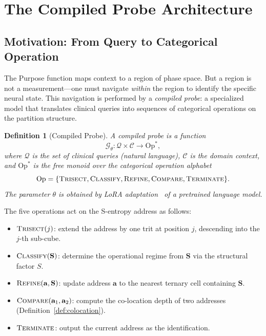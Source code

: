 \documentclass[aps,prd,twocolumn,superscriptaddress,floatfix,nofootinbib]{revtex4-2}
\newtheorem{definition}[theorem]{Definition}
\theoremstyle{remark}
\newcommand{\Svec}{\mathbf{S}}
\newcommand{\Context}{\mathcal{C}}
\newcommand{\Probe}{\mathcal{G}}
\begin{document}
\section{The Compiled Probe Architecture}
\label{sec:probe}

\subsection{Motivation: From Query to Categorical Operation}

The Purpose function maps context to a region of phase space.
But a region is not a measurement---one must navigate \emph{within} the region to identify the specific neural state.
This navigation is performed by a \emph{compiled probe}: a specialized model that translates clinical queries into sequences of categorical operations on the partition structure.

\begin{definition}[Compiled Probe]
\label{def:probe}
A compiled probe is a function
\begin{equation}
\Probe_\theta\colon \mathcal{Q} \times \Context \to \mathrm{Op}^*,
\end{equation}
where $\mathcal{Q}$ is the set of clinical queries (natural language), $\Context$ is the domain context, and $\mathrm{Op}^*$ is the free monoid over the categorical operation alphabet
\begin{equation}
\mathrm{Op} = \{\textsc{Trisect}, \textsc{Classify}, \textsc{Refine}, \textsc{Compare}, \textsc{Terminate}\}.
\end{equation}
The parameter $\theta$ is obtained by LoRA adaptation~\cite{hu2022lora} of a pretrained language model.
\end{definition}

The five operations act on the S-entropy address as follows:
\begin{itemize}[noitemsep]
    \item $\textsc{Trisect}(j)$: extend the address by one trit at position $j$, descending into the $j$-th sub-cube.
    \item $\textsc{Classify}(\Svec)$: determine the operational regime from $\Svec$ via the structural factor $S$.
    \item $\textsc{Refine}(\mathbf{a}, \Svec)$: update address $\mathbf{a}$ to the nearest ternary cell containing $\Svec$.
    \item $\textsc{Compare}(\mathbf{a}_1, \mathbf{a}_2)$: compute the co-location depth of two addresses (Definition~\ref{def:colocation}).
    \item $\textsc{Terminate}$: output the current address as the identification.
\end{itemize}
\end{document}
